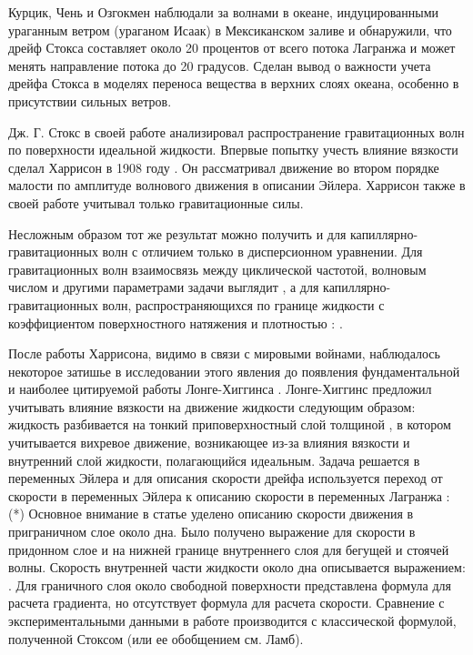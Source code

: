 Курцик, Чень и Озгокмен наблюдали за волнами в океане, индуцированными ураганным ветром (ураганом Исаак) в Мексиканском заливе \cite{curcic2016hurricane} и обнаружили, что дрейф Стокса составляет около 20 процентов от всего потока Лагранжа и может менять направление потока до 20 градусов. Сделан вывод о важности учета дрейфа Стокса в моделях переноса вещества в верхних слоях океана, особенно в присутствии сильных ветров.

Дж. Г. Стокс в своей работе анализировал распространение гравитационных волн по поверхности идеальной жидкости. Впервые попытку учесть влияние вязкости сделал Харрисон в 1908 году \cite{harrison1909influence}. Он рассматривал движение во втором порядке малости по амплитуде волнового движения в описании Эйлера. Харрисон также в своей работе учитывал только гравитационные силы.

Несложным образом тот же результат можно получить и для капиллярно-гравитационных волн \cite{lamb1932hydrodynamics} с отличием только в дисперсионном уравнении. Для гравитационных волн взаимосвязь между циклической частотой, волновым числом и другими параметрами задачи выглядит  , а для капиллярно-гравитационных волн, распространяющихся по границе жидкости с коэффициентом поверхностного натяжения   и плотностью  :  .

После работы Харрисона, видимо в связи с мировыми войнами, наблюдалось некоторое затишье в исследовании этого явления до появления фундаментальной и наиболее цитируемой работы Лонге-Хиггинса \cite{longuet1953mass}. Лонге-Хиггинс предложил учитывать влияние вязкости на движение жидкости следующим образом: жидкость разбивается на тонкий приповерхностный слой толщиной  , в котором учитывается вихревое движение, возникающее из-за влияния вязкости и внутренний слой жидкости, полагающийся идеальным. 
Задача решается в переменных Эйлера и для описания скорости дрейфа используется переход от скорости в переменных Эйлера   к описанию скорости в переменных Лагранжа  :
(*)
Основное внимание в статье уделено описанию скорости движения в приграничном слое около дна. Было получено выражение для скорости в придонном слое и на нижней границе внутреннего слоя для бегущей и стоячей волны. Скорость внутренней части жидкости около дна описывается выражением:
.
Для граничного слоя около свободной поверхности представлена формула для расчета градиента, но отсутствует формула для расчета скорости. Сравнение с экспериментальными данными в работе производится с классической формулой, полученной Стоксом (или ее обобщением см. Ламб).

